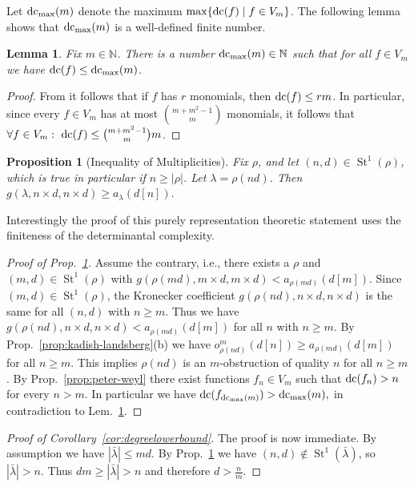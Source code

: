\documentclass{article}
\numberwithin{equation}{section}
\newtheorem{lemma}[equation]{Lemma}
\newtheorem{proposition}[equation]{Proposition}
\theoremstyle{definition}
\def\la{\lambda}
\newcommand{\dcmax}{{\textup{dc$_{\textup{max}}$}}}
\newcommand{\dcorig}{\textup{dc}}
\DeclareMathOperator{\St}{St}
\begin{document}
Let $\dcmax(m)$ denote the maximum $\max\{\dcorig(f) \mid f \in V_m\}$.
The following lemma shows that $\dcmax(m)$ is a well-defined finite number.

\begin{lemma}\label{lem:finite_dc}
Fix $m \in \mathbb N$.
There is a number $\dcmax(m) \in \mathbb N$ such that
for all $f \in V_m$
we have $\dcorig(f)\leq \dcmax(m)$.
\end{lemma}
\begin{proof}
From \cite{Val:79b} it follows that if $f$ has $r$ monomials, then $\dcorig(f)\leq rm$.
In particular, since every $f \in V_m$ has at most $\binom{m+m^2-1}{m}$ monomials, it follows that
$\forall f \in V_m : \ \dcorig(f) \leq \binom{m+m^2-1}{m}m$.
\end{proof}

\begin{proposition}[Inequality of Multiplicities]\label{pro:main}
Fix $\rho$, and let $(n,d) \in \St^1(\rho)$,
which is true in particular if $n \geq |\rho|$.
Let $\la = \rho(nd)$. Then 
$
g( \la , n \times d, n \times d) \geq a_\la(d[n]).
$
\end{proposition}
Interestingly the proof of this purely representation theoretic statement uses the finiteness of the determinantal complexity.
\begin{proof}[Proof of Prop.~\ref{pro:main}]
Assume the contrary, i.e., there exists a $\rho$ and $(m,d) \in \St^1(\rho)$ with
$
g(\rho(md), m \times d, m \times d) < a_{ \rho(md)}(d[m]).
$
Since $(m,d) \in \St^1(\rho)$, the Kronecker coefficient $g(\rho(nd),n\times d,n \times d)$ is the same for all $(n,d)$ with $n\geq m$.
Thus we have 
$
g(\rho(n d), n \times d, n \times d) <  a_{\rho( md )}(d[m])
$
for all $n$ with $n\geq m$.
By Prop.~\ref{prop:kadish-landsberg}(b) we have $o_{\rho(n d)}^{m}(d[n])\geq a_{\rho( md )}(d[m])$
for all $n \geq m$.
This implies $\rho(nd)$ is an $m$-obstruction of quality $n$ for all $n \geq m$.
By Prop.~\ref{prop:peter-weyl} there exist functions $f_n \in V_m$
such that $\dcorig(f_n) > n$ for every $n > m$.
In particular we have
$
\dcorig(f_{\dcmax(m)}) > \dcmax(m),
$
in contradiction to Lem.~\ref{lem:finite_dc}.
\end{proof}

\begin{proof}[Proof of Corollary~\ref{cor:degreelowerbound}]
The proof is now immediate.
By assumption we have $|\bar\la|\leq md$. By Prop.~\ref{pro:main} we have
$(n,d)\notin\St^1(\bar\la)$, so $|\bar\la|>n$.
Thus $dm \geq |\bar\la| > n$ and therefore $d > \frac n m$.
\end{proof}
\end{document}
